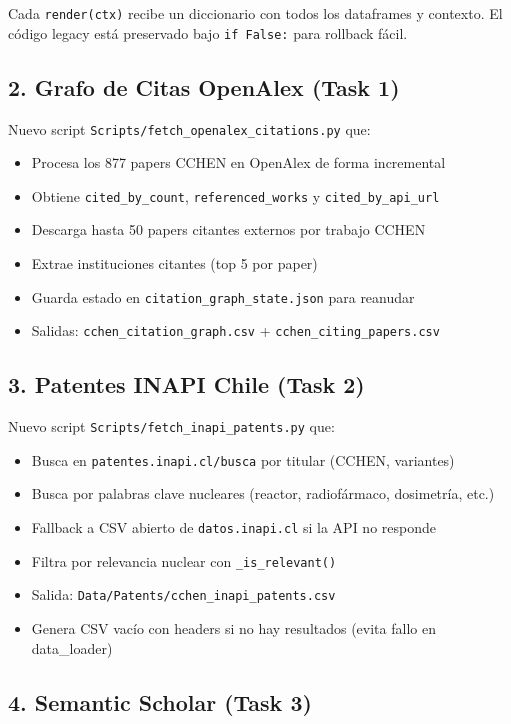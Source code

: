 \documentclass[12pt,a4paper]{report}
\begin{document}
Cada \texttt{render(ctx)} recibe un diccionario con todos los dataframes y contexto.
El código legacy está preservado bajo \texttt{if False:} para rollback fácil.

\subsection*{2. Grafo de Citas OpenAlex (Task 1)}

Nuevo script \texttt{Scripts/fetch\_openalex\_citations.py} que:
\begin{itemize}
  \item Procesa los 877 papers CCHEN en OpenAlex de forma incremental
  \item Obtiene \texttt{cited\_by\_count}, \texttt{referenced\_works} y \texttt{cited\_by\_api\_url}
  \item Descarga hasta 50 papers citantes externos por trabajo CCHEN
  \item Extrae instituciones citantes (top 5 por paper)
  \item Guarda estado en \texttt{citation\_graph\_state.json} para reanudar
  \item Salidas: \texttt{cchen\_citation\_graph.csv} + \texttt{cchen\_citing\_papers.csv}
\end{itemize}

\subsection*{3. Patentes INAPI Chile (Task 2)}

Nuevo script \texttt{Scripts/fetch\_inapi\_patents.py} que:
\begin{itemize}
  \item Busca en \texttt{patentes.inapi.cl/busca} por titular (CCHEN, variantes)
  \item Busca por palabras clave nucleares (reactor, radiofármaco, dosimetría, etc.)
  \item Fallback a CSV abierto de \texttt{datos.inapi.cl} si la API no responde
  \item Filtra por relevancia nuclear con \texttt{\_is\_relevant()}
  \item Salida: \texttt{Data/Patents/cchen\_inapi\_patents.csv}
  \item Genera CSV vacío con headers si no hay resultados (evita fallo en data\_loader)
\end{itemize}

\subsection*{4. Semantic Scholar (Task 3)}
\end{document}
